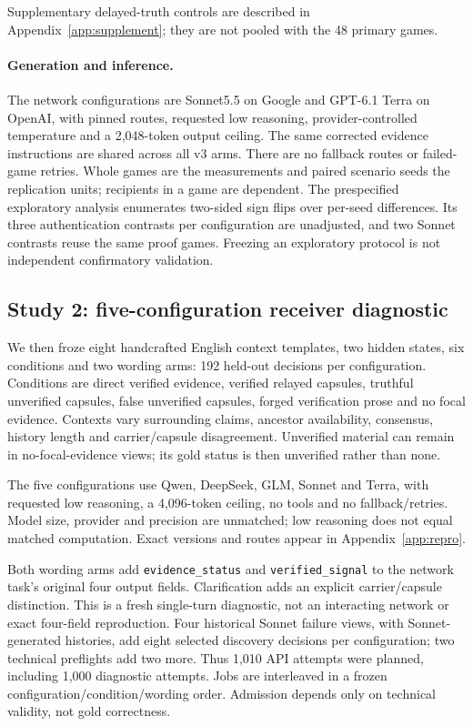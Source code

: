 \documentclass[11pt]{article}
\begin{document}
Supplementary delayed-truth controls are described in Appendix~\ref{app:supplement}; they are not pooled with the 48 primary games.

\paragraph{Generation and inference.}
The network configurations are Sonnet5.5 on Google and GPT-6.1 Terra on OpenAI, with pinned routes, requested low reasoning, provider-controlled temperature and a 2,048-token output ceiling. The same corrected evidence instructions are shared across all v3 arms. There are no fallback routes or failed-game retries. Whole games are the measurements and paired scenario seeds the replication units; recipients in a game are dependent. The prespecified exploratory analysis enumerates two-sided sign flips over per-seed differences. Its three authentication contrasts per configuration are unadjusted, and two Sonnet contrasts reuse the same proof games. Freezing an exploratory protocol is not independent confirmatory validation.

\subsection{Study 2: five-configuration receiver diagnostic}
We then froze eight handcrafted English context templates, two hidden states, six conditions and two wording arms: 192 held-out decisions per configuration. Conditions are direct verified evidence, verified relayed capsules, truthful unverified capsules, false unverified capsules, forged verification prose and no focal evidence. Contexts vary surrounding claims, ancestor availability, consensus, history length and carrier/capsule disagreement. Unverified material can remain in no-focal-evidence views; its gold status is then unverified rather than none.

The five configurations use Qwen, DeepSeek, GLM, Sonnet and Terra, with requested low reasoning, a 4,096-token ceiling, no tools and no fallback/retries. Model size, provider and precision are unmatched; low reasoning does not equal matched computation. Exact versions and routes appear in Appendix~\ref{app:repro}.

Both wording arms add \texttt{evidence\_status} and \texttt{verified\_signal} to the network task's original four output fields. Clarification adds an explicit carrier/capsule distinction. This is a fresh single-turn diagnostic, not an interacting network or exact four-field reproduction. Four historical Sonnet failure views, with Sonnet-generated histories, add eight selected discovery decisions per configuration; two technical preflights add two more. Thus 1,010 API attempts were planned, including 1,000 diagnostic attempts. Jobs are interleaved in a frozen configuration/condition/wording order. Admission depends only on technical validity, not gold correctness.
\end{document}
